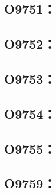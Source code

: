 \subsection{O9751：}



\clearpage
\subsection{O9752：}



\clearpage
\subsection{O9753：}



\clearpage
\subsection{O9754：}



\clearpage
\subsection{O9755：}



\clearpage
\subsection{O9759：}



